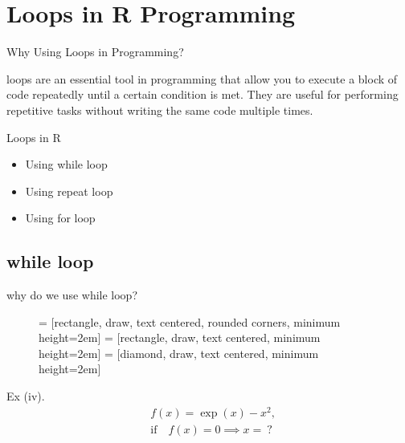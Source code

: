 \documentclass{beamer}\usepackage[]{graphicx}\usepackage[]{xcolor}
\begin{document}
\section{Loops in R Programming}
\begin{frame}{Why Using Loops in Programming?}

\begin{alertblock}
{\large loops are an essential tool in programming that allow you to execute a block of code repeatedly until a certain condition is met. They are useful for performing repetitive 
tasks without writing the same code multiple times.}
\end{alertblock}
\end{frame}




\begin{frame}{Loops in R}
\begin{itemize}
    \item Using while loop
    \item Using repeat loop
    \item Using for loop
\end{itemize}
\end{frame}
\subsection{while loop}
\begin{frame}{why do we use while loop?}
    \begin{figure}[H]
        \centering
     = [rectangle, draw, text centered, rounded corners, minimum height=2em]
     = [rectangle, draw, text centered, minimum height=2em]
     = [diamond, draw, text centered, minimum height=2em]
\end{figure}
\end{frame}
\begin{frame}
    
    \begin{exampleblock}{Ex (iv).}
        \label{ex1}
\begin{align*}
    & f(x) = \exp(x) - x^2, \\
    & \text{if} \quad f(x) = 0 \implies x = ~?
\end{align*}
        
    \end{exampleblock}
\end{frame}
\end{document}
